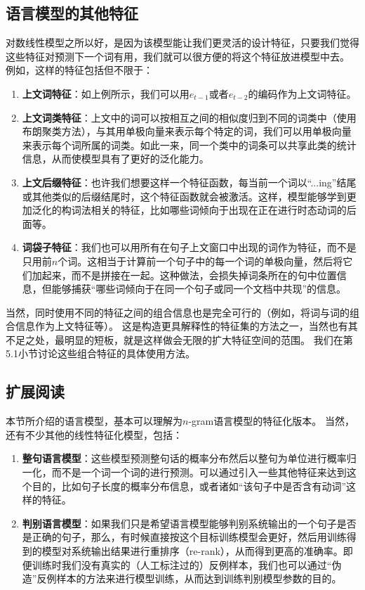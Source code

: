 \documentclass[10pt,a4paper]{ctexart}
\begin{document}
\subsection{语言模型的其他特征}
对数线性模型之所以好，是因为该模型能让我们更灵活的设计特征，只要我们觉得这些特征对预测下一个词有用，我们就可以很方便的将这个特征放进模型中去。
例如，这样的特征包括但不限于：
\begin{enumerate}
\item[] \textbf{上文词特征}：如上例所示，我们可以用$e_{t-1}$或者$e_{t-2}$的编码作为上文词特征。
\item[] \textbf{上文词类特征}：上文中的词可以按相互之间的相似度归到不同的词类中（使用布朗聚类方法\cite{brown1992class}），与其用单极向量来表示每个特定的词，我们可以用单极向量来表示每个词所属的词类\cite{chen2009shrinking}。如此一来，同一个类中的词条可以共享此类的统计信息，从而使模型具有了更好的泛化能力。
\item[] \textbf{上文后缀特征}：也许我们想要这样一个特征函数，每当前一个词以“...ing”结尾或其他类似的后缀结尾时，这个特征函数就会被激活。这样，模型能够学到更加泛化的构词法相关的特征，比如哪些词倾向于出现在正在进行时态动词的后面等。
\item[] \textbf{词袋子特征}：我们也可以用所有在句子上文窗口中出现的词作为特征，而不是只用前$n$个词。这相当于计算前一个句子中的每一个词的单极向量，然后将它们加起来，而不是拼接在一起。这种做法，会损失掉词条所在的句中位置信息，但能够捕获“哪些词倾向于在同一个句子或同一个文档中共现”的信息。
\end{enumerate}

当然，同时使用不同的特征之间的组合信息也是完全可行的（例如，将词与词的组合信息作为上文特征等）。
这是构造更具解释性的特征集的方法之一，当然也有其不足之处，最明显的短板，就是这样做会无限的扩大特征空间的范围。
我们在第5.1小节讨论这些组合特征的具体使用方法。

\subsection{扩展阅读}
本节所介绍的语言模型，基本可以理解为$n$-gram语言模型的特征化版本。
当然，还有不少其他的线性特征化模型，包括：
\begin{enumerate}
\item[] \textbf{整句语言模型}：这些模型预测整句话的概率分布然后以整句为单位进行概率归一化\cite{rosenfeld2001whole}，而不是一个词一个词的进行预测。可以通过引入一些其他特征来达到这个目的，比如句子长度的概率分布信息，或者诸如“该句子中是否含有动词”这样的特征。
\item[] \textbf{判别语言模型}：如果我们只是希望语言模型能够判别系统输出的一个句子是否是正确的句子，那么，有时候直接按这个目标训练模型会更好，然后用训练得到的模型对系统输出结果进行重排序（re-rank），从而得到更高的准确率\cite{roark2004discriminative}。即便训练时我们没有真实的（人工标注过的）反例样本，我们也可以通过“伪造”反例样本的方法来进行模型训练，从而达到训练判别模型参数的目的\cite{tsujiiythu2007discriminative}。
\end{enumerate}
\end{document}
